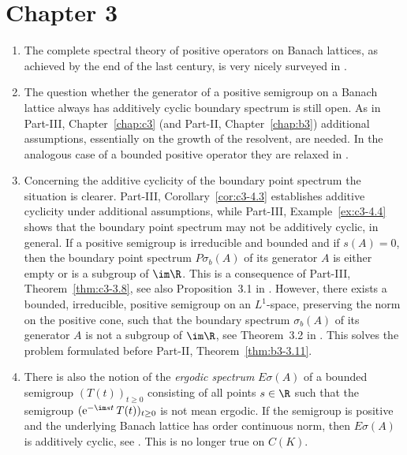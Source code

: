 \section*{Chapter 3}
\begin{enumerate}

\item 
The complete spectral theory of positive operators on Banach lattices, as achieved by the end of the last century,
is very nicely surveyed in \textcite{zbmath00774970}.

\item 
The question whether the generator of a positive semigroup on a Banach lattice always has additively cyclic boundary spectrum is still open. 
As in Part-III, Chapter~\ref{chap:c3}  (and Part-II, Chapter~\ref{chap:b3}) additional assumptions, essentially on the growth of the resolvent, are needed. 
In the analogous case of a bounded positive operator they are relaxed in \textcite{zbmath06591946}.


\item 
Concerning the additive cyclicity of the boundary point spectrum the situation is clearer. 
Part-III, Corollary~\ref{cor:c3-4.3} establishes additive cyclicity under additional assumptions, while 
Part-III, Example~\ref{ex:c3-4.4} shows that the boundary point spectrum may not be additively cyclic, in general.
If a positive semigroup is irreducible and bounded and if $s(A) = 0$,  then the boundary point spectrum $P\sigma_{b}(A)$ of its generator $A$ is either empty or is a subgroup of $\im\R$. 
This is a consequence of Part-III, Theorem~\ref{thm:c3-3.8}, see also Proposition~3.1 in \textcite{zbmath07423250}.
However, there exists a bounded, irreducible, positive semigroup on an $L^{1}$-space,  preserving the norm  on the positive cone, such that the  boundary spectrum 
$\sigma_{b}(A)$ of its generator $A$ 
is not a subgroup of $\im\R$, see Theorem~3.2 in \textcite{zbmath07423250}.
This solves the problem formulated before  Part-II, Theorem~\ref{thm:b3-3.11}.

\item 
There is also the notion of the \emph{ergodic spectrum} $E\sigma(A)$ of a bounded semigroup $(T(t))_{t\geq 0}$ consisting of all points $s\in\R$ such that the semigroup 
$(\mathrm{e}^{-\im st}\,T(t))_{t\geq 0}$
is not mean ergodic. 
If the semigroup is positive and the underlying Banach lattice has order continuous norm, then $E\sigma(A)$ is additively cyclic,
see \textcite{zbmath00763800}. 
This is no longer true on $C(K)$. 


\end{enumerate}
